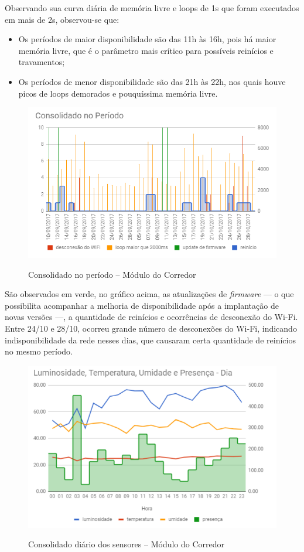 Observando sua curva diária de memória livre e loops de 1s que foram executados em mais de 2s, observou-se que:

\begin{itemize}
	\item Os períodos de maior disponibilidade são das 11h às 16h, pois há maior memória livre, que é o parâmetro mais crítico para possíveis reinícios e travamentos;
	\item Os períodos de menor disponibilidade são das 21h às 22h, nos quais houve picos de loops demorados e pouquíssima memória livre.
\end{itemize}

\begin{figure}[H]
	\centering
	\caption{Consolidado no período -- Módulo do Corredor}
	\includegraphics[width=1.0\textwidth]{periodoCorredor}
	\label{fig:periodoCorredor}
\end{figure}

São observados em verde, no gráfico acima, as atualizações de \emph{firmware} --- o que possibilita acompanhar a melhoria de disponibilidade após a implantação de novas versões ---, a quantidade de reinícios e ocorrências de desconexão do Wi-Fi. Entre 24/10 e 28/10, ocorreu grande número de desconexões do Wi-Fi, indicando indisponibilidade da rede nesses dias, que causaram certa quantidade de reinícios no mesmo período.

\begin{figure}[H]
	\centering
	\caption{Consolidado diário dos sensores -- Módulo do Corredor}
	\includegraphics[width=1.0\textwidth]{sensoresdiaCorredor}
	\label{fig:sensoresdiaCorredor}
\end{figure}


